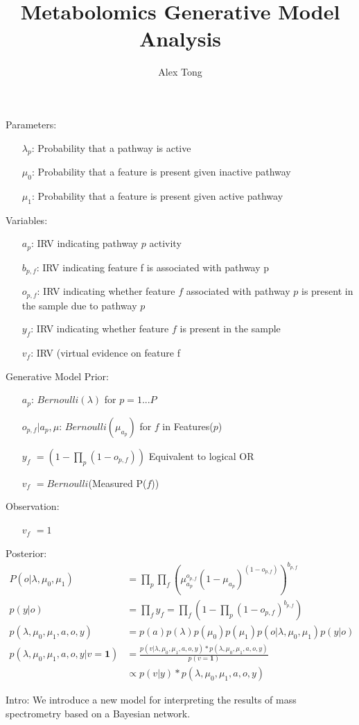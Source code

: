 \documentclass[11pt]{article}
\title{Metabolomics Generative Model Analysis}
\author{Alex Tong}
\begin{document}
\maketitle

Parameters:
\begin{itemize}
\item[$\lambda_p$:] Probability that a pathway is active
\item[$\mu_0$:] Probability that a feature is present given inactive pathway
\item[$\mu_1$:] Probability that a feature is present given active pathway
\end{itemize}

Variables:
\begin{itemize}
\item [$a_p$:] IRV indicating pathway $p$ activity
\item [$b_{p,f}$:] IRV indicating feature f is associated with pathway p
\item[$o_{p,f}$:] IRV indicating whether feature $f$ associated with pathway $p$ is present in the sample due to pathway $p$
\item[$y_f$:] IRV indicating whether feature $f$ is present in the sample
\item[$v_f$:] IRV (virtual evidence on feature f
\end{itemize}

Generative Model Prior:
\begin{itemize}
\item [$a_p$:] $Bernoulli(\lambda)$ for $p = 1 ... P$
\item [$o_{p,f} | a_p, \mu$:] $Bernoulli(\mu_{a_p})$ for $f$ in Features($p$)
\item [$y_f$]  $= (1 -  \prod_p (1 - o_{p,f}))$ Equivalent to logical OR
\item [$v_f$] $= Bernoulli$(Measured P($f$))
\end{itemize}

Observation:
\begin{itemize}
\item [$v_f$] $ = 1$
\end{itemize}

Posterior:
\begin{align}
P(o | \lambda, \mu_0, \mu_1) &= \prod_p \prod_{f} (\mu_{a_p}^{o_{p,f}} (1-\mu_{a_p})^{(1-o_{p,f})})^{b_{p,f}} \\
p(y | o) &= \prod_f y_f = \prod_f (1 - \prod_p (1 - o_{p,f})^{b_{p,f}}) \\
p(\lambda, \mu_0, \mu_1, a, o, y) &= p(a)p(\lambda) p(\mu_0) p(\mu_1) p( o | \lambda, \mu_0, \mu_1) p(y | o) \\
p(\lambda, \mu_0, \mu_1, a, o, y | v = \mathbf{1}) &= \frac{p(v | \lambda, \mu_0, \mu_1, a, o, y) * p(\lambda, \mu_0, \mu_1, a, o, y)}{p(v = \mathbf{1})}  \\
&\propto p(v | y) * p(\lambda, \mu_0, \mu_1, a, o, y) 
\end{align}

Intro:
We introduce a new model for interpreting the results of mass spectrometry based on a Bayesian network. 
\end{document}
